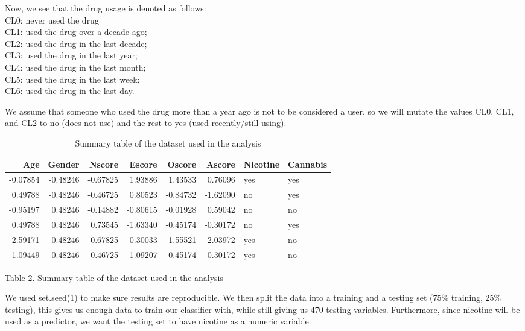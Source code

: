 \documentclass[
]{article}
\begin{document}
Now, we see that the drug usage is denoted as follows:\\
CL0: never used the drug\\
CL1: used the drug over a decade ago;\\
CL2: used the drug in the last decade;\\
CL3: used the drug in the last year;\\
CL4: used the drug in the last month;\\
CL5: used the drug in the last week;\\
CL6: used the drug in the last day.

We assume that someone who used the drug more than a year ago is not to
be considered a user, so we will mutate the values CL0, CL1, and CL2 to
no (does not use) and the rest to yes (used recently/still using).

\begin{table}

\caption{\label{tab:drugs-table}Summary table of the dataset used in the analysis}
\centering
\begin{tabular}[t]{r|r|r|r|r|r|l|l}
\hline
Age & Gender & Nscore & Escore & Oscore & Ascore & Nicotine & Cannabis\\
\hline
-0.07854 & -0.48246 & -0.67825 & 1.93886 & 1.43533 & 0.76096 & yes & yes\\
\hline
0.49788 & -0.48246 & -0.46725 & 0.80523 & -0.84732 & -1.62090 & no & yes\\
\hline
-0.95197 & 0.48246 & -0.14882 & -0.80615 & -0.01928 & 0.59042 & no & no\\
\hline
0.49788 & 0.48246 & 0.73545 & -1.63340 & -0.45174 & -0.30172 & no & yes\\
\hline
2.59171 & 0.48246 & -0.67825 & -0.30033 & -1.55521 & 2.03972 & yes & no\\
\hline
1.09449 & -0.48246 & -0.46725 & -1.09207 & -0.45174 & -0.30172 & yes & no\\
\hline
\end{tabular}
\end{table}

Table 2. Summary table of the dataset used in the analysis

We used set.seed(1) to make sure results are reproducible. We then split
the data into a training and a testing set (75\% training, 25\% testing),
this gives us enough data to train our classifier with, while still
giving us 470 testing variables. Furthermore, since nicotine will be
used as a predictor, we want the testing set to have nicotine as a
numeric variable.
\end{document}
